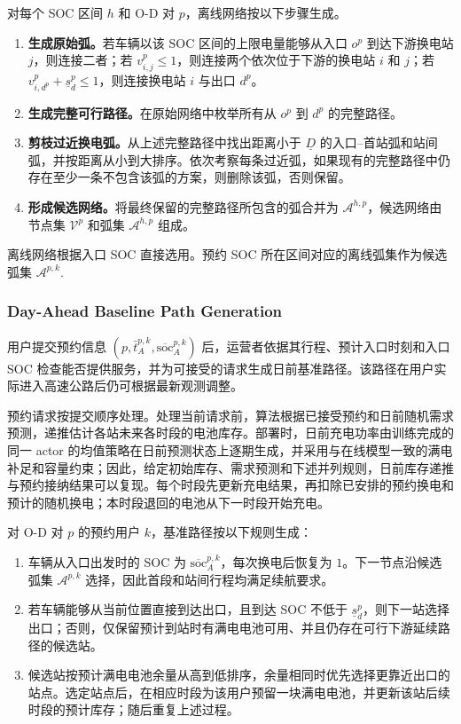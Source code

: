 \documentclass[12pt,a4paper,UTF8]{ctexart}
\begin{document}
对每个 SOC 区间 $h$ 和 O-D 对 $p$，离线网络按以下步骤生成。

\begin{enumerate}
  \item[\textbf{Step 1.}] \textbf{生成原始弧。}若车辆以该 SOC 区间的上限电量能够从入口 $o^p$ 到达下游换电站 $j$，则连接二者；若 $v_{i,j}^p\le1$，则连接两个依次位于下游的换电站 $i$ 和 $j$；若 $v_{i,d^p}^p+\underline s_d^p\le1$，则连接换电站 $i$ 与出口 $d^p$。

  \item[\textbf{Step 2.}] \textbf{生成完整可行路径。}在原始网络中枚举所有从 $o^p$ 到 $d^p$ 的完整路径。

  \item[\textbf{Step 3.}] \textbf{剪枝过近换电弧。}从上述完整路径中找出距离小于 $\underline D$ 的入口--首站弧和站间弧，并按距离从小到大排序。依次考察每条过近弧，如果现有的完整路径中仍存在至少一条不包含该弧的方案，则删除该弧，否则保留。

  \item[\textbf{Step 4.}] \textbf{形成候选网络。}将最终保留的完整路径所包含的弧合并为 $\mathcal A^{h,p}$，候选网络由节点集 $\mathcal V^p$ 和弧集 $\mathcal A^{h,p}$ 组成。
\end{enumerate}


离线网络根据入口 SOC 直接选用。预约 SOC 所在区间对应的离线弧集作为候选弧集 $\mathcal A^{p,k}$.




\subsubsection{Day-Ahead Baseline Path Generation}

用户提交预约信息
$\left(p,\bar t_A^{p,k},\overline{\mathrm{soc}}_A^{p,k}\right)$
后，运营者依据其行程、预计入口时刻和入口 SOC 检查能否提供服务，并为可接受的请求生成日前基准路径。该路径在用户实际进入高速公路后仍可根据最新观测调整。

预约请求按提交顺序处理。处理当前请求前，算法根据已接受预约和日前随机需求预测，递推估计各站未来各时段的电池库存。部署时，日前充电功率由训练完成的同一 actor 的均值策略在日前预测状态上逐期生成，并采用与在线模型一致的满电补足和容量约束；因此，给定初始库存、需求预测和下述并列规则，日前库存递推与预约接纳结果可以复现。每个时段先更新充电结果，再扣除已安排的预约换电和预计的随机换电；本时段退回的电池从下一时段开始充电。

对 O-D 对 $p$ 的预约用户 $k$，基准路径按以下规则生成：
\begin{enumerate}
  \item 车辆从入口出发时的 SOC 为 $\overline{\mathrm{soc}}_A^{p,k}$，每次换电后恢复为 $1$。下一节点沿候选弧集 $\mathcal A^{p,k}$ 选择，因此首段和站间行程均满足续航要求。
  \item 若车辆能够从当前位置直接到达出口，且到达 SOC 不低于 $\underline s_d^p$，则下一站选择出口；否则，仅保留预计到站时有满电电池可用、并且仍存在可行下游延续路径的候选站。
  \item 候选站按预计满电电池余量从高到低排序，余量相同时优先选择更靠近出口的站点。选定站点后，在相应时段为该用户预留一块满电电池，并更新该站后续时段的预计库存；随后重复上述过程。
\end{enumerate}
\end{document}
